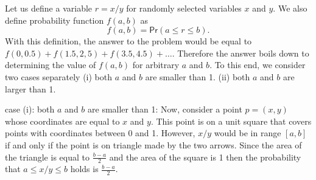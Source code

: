 \begin{solution}
Let us define a variable $r = x/y$ for randomly selected variables $x$ and $y$. We also define probability function $f(a,b)$ as 
$$f(a,b) = \mathsf{Pr}(a \leq r \leq b).$$
With this definition, the answer to the problem would be equal to $f(0,0.5) + f(1.5, 2,5) + f(3.5,4.5) + \ldots$. Therefore the answer boils down to determining the value of $f(a,b)$ for arbitrary $a$ and $b$. To this end, we consider two cases separately (i) both $a$ and $b$ are smaller than 1. (ii) both $a$ and $b$ are larger than 1.

case (i): both $a$ and $b$ are smaller than 1: Now, consider a point $p = (x,y)$ whose coordinates are equal to $x$ and $y$. This point is on a unit square that covers points with coordinates between 0 and 1. However, $x/y$ would be in range $[a,b]$ if and only if the point is on triangle made by the two arrows. Since the area of the triangle is equal to $\frac{b-a}{2}$ and the area of the square is 1 then the probability that $a \leq x/y \leq b$ holds is $\frac{b-a}{2}$.


\end{solution}
